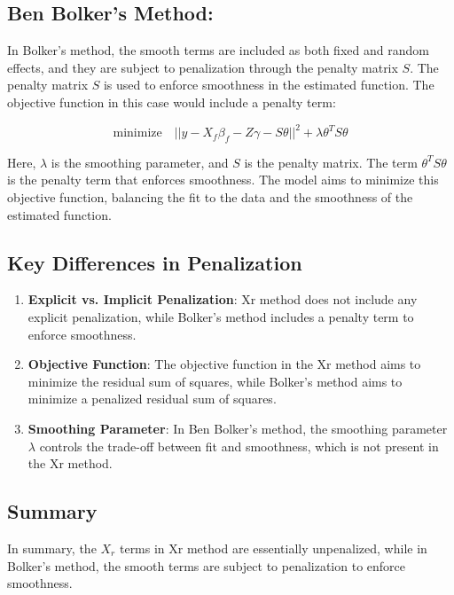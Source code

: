 \documentclass[12pt, twoside,hidelinks]{article}
\theoremstyle{definition}
\numberwithin{equation}{section}
\begin{document}
\subsection{Ben Bolker's Method:}

In Bolker's method, the smooth terms are included as both fixed and random effects, and they are subject to penalization through the penalty matrix \(S\). The penalty matrix \(S\) is used to enforce smoothness in the estimated function. The objective function in this case would include a penalty term:

\begin{equation}
\text{minimize} \quad ||y - X_f \beta_f - Z \gamma - S \theta||^2 + \lambda \theta^T S \theta
\end{equation}

Here, \(\lambda\) is the smoothing parameter, and \(S\) is the penalty matrix. The term \(\theta^T S \theta\) is the penalty term that enforces smoothness. The model aims to minimize this objective function, balancing the fit to the data and the smoothness of the estimated function.

\subsection{Key Differences in Penalization}

\begin{enumerate}
    \item \textbf{Explicit vs. Implicit Penalization}: Xr method does not include any explicit penalization, while Bolker's method includes a penalty term to enforce smoothness.
    
    \item \textbf{Objective Function}: The objective function in the Xr method aims to minimize the residual sum of squares, while Bolker's method aims to minimize a penalized residual sum of squares.
    
    \item \textbf{Smoothing Parameter}: In Ben Bolker's method, the smoothing parameter \(\lambda\) controls the trade-off between fit and smoothness, which is not present in the Xr method.
\end{enumerate}

\subsection{Summary}

In summary, the \(X_r\) terms in Xr method are essentially unpenalized, while in Bolker's method, the smooth terms are subject to penalization to enforce smoothness.
\end{document}
